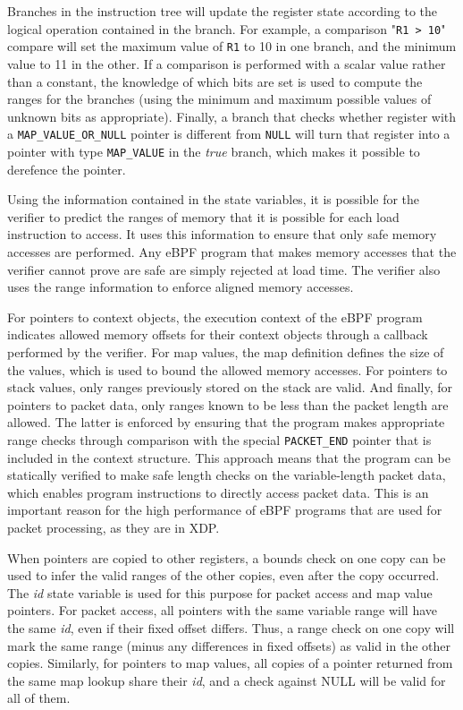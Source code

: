 \documentclass[10pt,sigconf]{acmart}
\begin{document}
Branches in the instruction tree will update the register state according to the
logical operation contained in the branch. For example, a comparison "\texttt{R1
  > 10}" compare will set the maximum value of \texttt{R1} to 10 in one branch,
and the minimum value to 11 in the other. If a comparison is performed with a
scalar value rather than a constant, the knowledge of which bits are set is used
to compute the ranges for the branches (using the minimum and maximum possible
values of unknown bits as appropriate). Finally, a branch that checks whether
register with a \texttt{MAP\_VALUE\_OR\_NULL} pointer is different from
\texttt{NULL} will turn that register into a pointer with type
\texttt{MAP\_VALUE} in the \emph{true} branch, which makes it possible to
derefence the pointer.

Using the information contained in the state variables, it is possible for the
verifier to predict the ranges of memory that it is possible for each load
instruction to access. It uses this information to ensure that only safe memory
accesses are performed. Any eBPF program that makes memory accesses that the
verifier cannot prove are safe are simply rejected at load time. The verifier
also uses the range information to enforce aligned memory accesses.

For pointers to context objects, the execution context of the eBPF program
indicates allowed memory offsets for their context objects through a callback
performed by the verifier. For map values, the map definition defines the size
of the values, which is used to bound the allowed memory accesses. For pointers
to stack values, only ranges previously stored on the stack are valid. And
finally, for pointers to packet data, only ranges known to be less than the
packet length are allowed. The latter is enforced by ensuring that the program
makes appropriate range checks through comparison with the special
\texttt{PACKET\_END} pointer that is included in the context structure. This
approach means that the program can be statically verified to make safe length
checks on the variable-length packet data, which enables program instructions to
directly access packet data. This is an important reason for the high
performance of eBPF programs that are used for packet processing, as they are in
XDP.

When pointers are copied to other registers, a bounds check on one copy can be
used to infer the valid ranges of the other copies, even after the copy
occurred. The \emph{id} state variable is used for this purpose for packet access and
map value pointers. For packet access, all pointers with the same variable
range will have the same \emph{id}, even if their fixed offset differs. Thus, a range
check on one copy will mark the same range (minus any differences in fixed
offsets) as valid in the other copies. Similarly, for pointers to map values,
all copies of a pointer returned from the same map lookup share their \emph{id}, and
a check against NULL will be valid for all of them.
\end{document}
